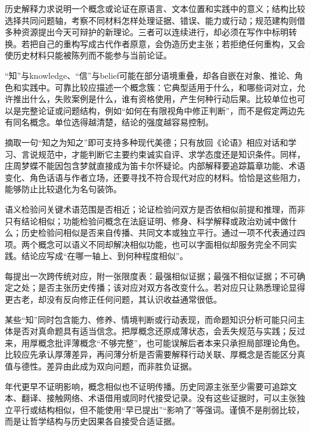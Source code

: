 历史解释力求说明一个概念或论证在原语言、文本位置和实践中的意义；结构比较选择共同问题轴，考察不同材料怎样处理证据、错误、能力或行动；规范建构则借多种资源提出今天可辩护的新理论。三者可以连续进行，却必须在写作中标明转换。若把自己的重构写成古代作者原意，会伪造历史主张；若拒绝任何重构，又会使历史材料只能被陈列而不能参与当前论证。

“知”与knowledge、“信”与belief可能在部分语境重叠，却各自嵌在对象、推论、角色和实践中。可靠比较应描述一个概念簇：它典型适用于什么，和哪些词对立，允许推出什么，失败案例是什么，谁有资格使用，产生何种行动后果。比较单位也可以是完整论证或问题结构，例如“如何在有限视角中修正判断”，而不是假定两边先有同名概念。单位选得越清楚，结论的强度越容易控制。

摘取一句“知之为知之”即可支持多种现代美德；只有放回《论语》相应对话和学习、言说规范中，才能判断它主要约束诚实自评、求学态度还是知识条件\parencite[2.17]{analects2003}。同样，庄周梦蝶不能因包含梦就直接成为笛卡尔怀疑论。内部解释要追踪篇章功能、术语变化、角色话语与作者立场，还要寻找不符合现代对应的材料。恰恰是这些阻力，能够防止比较退化为名句装饰。

语义检验问关键术语范围是否相近；论证检验问双方是否依相似前提和推理，而非只有结论相似；功能检验问概念在法庭证明、修身、科学解释或政治劝诫中做什么；历史检验问相似是否来自传播、共同文本或独立平行。通过一项不代表通过四项。两个概念可以语义不同却解决相似功能，也可以字面相似却服务完全不同实践。结论应写成“在哪一轴上、到何种程度相似”。

\begin{argumentbox}
每提出一次跨传统对应，附一张限度表：最强相似证据；最强不相似证据；不可确定之处；是否主张历史传播；该对应对双方各改变什么。若对应只让熟悉理论显得更古老，却没有反向修正任何问题，其认识收益通常很低。
\end{argumentbox}

某些“知”同时包含能力、修养、情境判断或行动表现，而命题知识分析可能只问主体是否对真命题具有适当信念。把厚概念还原成薄状态，会丢失规范与实践；反过来，用厚概念批评薄概念“不够完整”，也可能误解后者本来只承担局部理论角色。比较应先承认厚薄差异，再问薄分析是否需要解释行动关联、厚概念是否能区分真值与德性。差异由此成为双向问题，而非胜负证据。

年代更早不证明影响，概念相似也不证明传播。历史同源主张至少需要可追踪文本、翻译、接触网络、术语借用或同时代接受记录。没有这些证据时，可以主张独立平行或结构相似，但不能使用“早已提出”“影响了”等强词。谨慎不是削弱比较，而是让哲学结构与历史因果各自接受合适证据。

